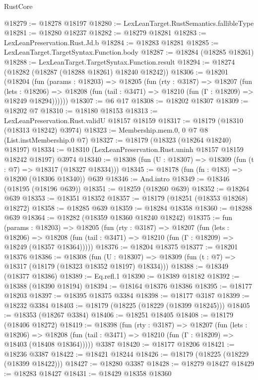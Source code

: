 \begin{lexlean}{RustCore}
\begin{coremodule}
@18279 := @18278 @18197
@18280 := LexLeanTarget.RustSemantics.fallibleType
@18281 := @18280 @18237
@18282 := @18279 @18281
@18283 := LexLeanPreservation.Rust.Jd.b
@18284 := @18283 @18281
@18285 := LexLeanTarget.TargetSyntax.Function.body
@18287 := @18284 (@18285 @18261)
@18288 := LexLeanTarget.TargetSyntax.Function.result
@18294 := @18274 (@18282 (@18287 (@18288 @18261) @18240 @18242))
@18306 := @18201
    (@18204
      (fun (params : @18203) =>
      @18205
        (fun (rty : @3187) =>
        @18207
          (fun (lets : @18206) =>
          @18208 (fun (tail : @3471) => @18210 (fun (Γ : @18209) => @18249 @18294))))))
@18307 := @6 @17
@18308 := @18202 @18307
@18309 := @18202 @7
@18310 := @18180 @18153
@18313 := LexLeanPreservation.Rust.validU @18157 @18159
@18317 := @18179 (@18310 (@18313 @18242) @3974)
@18323 := Membership.mem.{0, 0} @7 @8 (List.instMembership.{0} @7)
@18327 := @18179 (@18323 (@18264 @18240) @18197)
@18334 := @18310 (LexLeanPreservation.Rust.uninh @18157 @18159 @18242 @18197) @3974
@18340 := @18308 (fun (U : @18307) => @18309 (fun (t : @7) => @18317 (@18327 @18334)))
@18345 := @18178 (fun (fn : @183) => @18200 (@18306 @18340)) @639
@18346 := And.intro
@18349 := @18346 (@18195 (@18196 @639))
@18351 := @18259 (@18260 @639)
@18352 := @18264 @639
@18353 := @18351 @18352
@18357 := @18179 (@18251 (@18353 @18268) @18272)
@18358 := @18285 @639
@18359 := @18284 @18358
@18360 := @18288 @639
@18364 := @18282 (@18359 @18360 @18240 @18242)
@18375 := fun (params : @18203) =>
  @18205
    (fun (rty : @3187) =>
    @18207
      (fun (lets : @18206) =>
      @18208 (fun (tail : @3471) => @18210 (fun (Γ : @18209) => @18249 (@18357 @18364)))))
@18376 := @18204 @18375
@18377 := @18201 @18376
@18386 := @18308
    (fun (U : @18307) => @18309 (fun (t : @7) => @18317 (@18179 (@18323 @18352 @18197) @18334)))
@18388 := @18349 (@18377 @18386)
@18389 := Eq.refl.{1}
@18390 := @18389 @18182
@18392 := @18388 (@18390 @18194)
@18394 := @18164 @18376 @18386
@18395 := @18177 @18203
@18397 := @18395 @18375 @3384
@18398 := @18177 @3187
@18399 := @18232 @3384
@18403 := @18179 (@18225 (@18229 (@18399 @18245)))
@18405 := @18353 (@18267 @3384)
@18406 := @18251 @18405
@18408 := @18179 (@18406 @18272)
@18419 := @18398
    (fun (rty : @3187) =>
    @18207
      (fun (lets : @18206) =>
      @18208 (fun (tail : @3471) => @18210 (fun (Γ : @18209) => @18403 (@18408 @18364)))))
    @3387
@18420 := @18177 @18206
@18421 := @18236 @3387
@18422 := @18421 @18244
@18426 := @18179 (@18225 (@18229 (@18399 @18422)))
@18427 := @18280 @3387
@18428 := @18279 @18427
@18429 := @18283 @18427
@18431 := @18429 @18358 @18360

\end{coremodule}
\end{lexlean}
